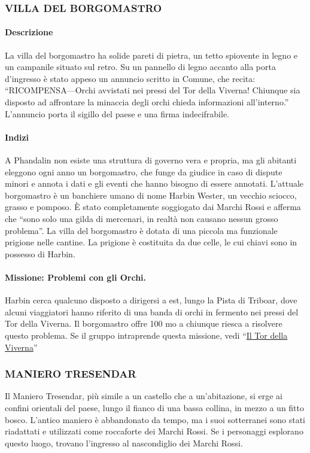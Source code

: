\documentclass{article}
\begin{document}
\subsubsection{VILLA DEL BORGOMASTRO}
\hypertarget{villa}{}
\paragraph{Descrizione}La villa del borgomastro ha solide pareti di pietra, un tetto
spiovente in legno e un campanile situato sul retro. Su un
pannello di legno accanto alla porta d’ingresso è stato appeso
un annuncio scritto in Comune, che recita:
“RICOMPENSA—Orchi avvistati nei pressi del Tor della
Viverna! Chiunque sia disposto ad affrontare la minaccia degli
orchi chieda informazioni all’interno.” L'annuncio porta il
sigillo del paese e una firma indecifrabile.
\paragraph{Indizi}A Phandalin non esiste una struttura di governo vera e
propria, ma gli abitanti eleggono ogni anno un borgomastro,
che funge da giudice in caso di dispute minori e annota i dati
e gli eventi che hanno bisogno di essere annotati. L'attuale
borgomastro è un banchiere umano di nome Harbin Wester,
un vecchio sciocco, grasso e pomposo. È stato completamente
soggiogato dai Marchi Rossi e afferma che “sono solo
una gilda di mercenari, in realtà non causano nessun
grosso problema”.
La villa del borgomastro è dotata di una piccola ma
funzionale prigione nelle cantine. La prigione è costituita da
due celle, le cui chiavi sono in possesso di Harbin.
\paragraph{Missione: Problemi con gli Orchi.}
Harbin cerca qualcuno
disposto a dirigersi a est, lungo la Pista di Triboar, dove
alcuni viaggiatori hanno riferito di una banda di orchi in
fermento nei pressi del Tor della Viverna. Il borgomastro
offre 100 mo a chiunque riesca a risolvere questo problema.
Se il gruppo intraprende questa missione, vedi “\hyperlink{tor}{Il Tor della
Viverna}”
\subsubsection{MANIERO TRESENDAR}Il Maniero Tresendar, più simile a un castello che a
un'abitazione, si erge ai confini orientali del paese, lungo il
fianco di una bassa collina, in mezzo a un fitto bosco. L'antico
maniero è abbandonato da tempo, ma i suoi sotterranei sono
stati riadattati e utilizzati come roccaforte dei Marchi Rossi.
Se i personaggi esplorano questo luogo, trovano l’ingresso al
nascondiglio dei Marchi Rossi.
\end{document}
